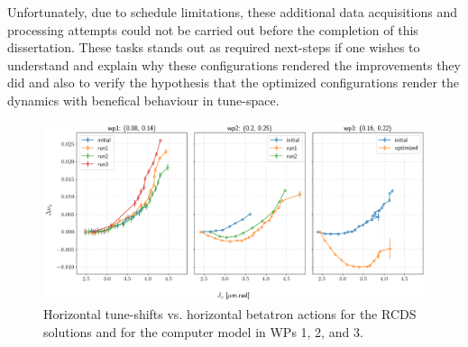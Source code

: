 Unfortunately, due to schedule limitations, these additional data acquisitions and processing attempts could not be carried out before the completion of this dissertation. These tasks stands out as required next-steps if one wishes to understand and explain why these configurations rendered the improvements they did and also to verify the hypothesis that the optimized configurations render the dynamics with benefical behaviour in tune-space. 
\begin{figure}[tb]
    \includegraphics[width=\columnwidth]{Images/adts.png}
    \caption[Horizontal tune-shifts vs. horizontal betatron actions for the RCDS solutions and for the computer model in WPs 1, 2, and 3.]{Horizontal tune-shifts vs. horizontal betatron actions for the \gls*{RCDS} solutions and for the computer model in WPs 1, 2, and 3.}
    \label{fig:adts}
\end{figure}
